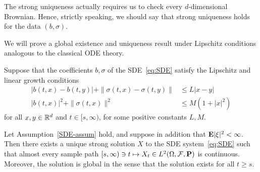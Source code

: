 \begin{remark}
	The strong uniqueness actually requires us to check every $d$-dimensional Brownian. Hence, strictly speaking, we should say that strong uniqueness holds for the data $(b,\sigma)$.
\end{remark}

We will prove a global existence and uniqueness result under Lipschitz conditions analogous to the classical ODE theory.

\begin{assumption}
	\label{SDE-assum}
	Suppose that the coefficients $b,\sigma$ of the SDE~\eqref{eq:SDE} satisfy the Lipschitz and linear growth conditions
	\begin{align}
		|b(t,x)-b(t,y)|+\|\sigma(t,x)-\sigma(t,y)\| &\le L|x-y| \label{eq:Lip}\\
		|b(t,x)|^2 + \|\sigma(t,x)\|^2 &\le M(1+|x|^2) \label{eq:growth}
	\end{align}
	for all $x,y\in\mathbb{R}^d$ and $t\in [s,\infty)$, for some positive constants $L,M$.
\end{assumption}

\begin{theorem}
\label{thm:SDE-exist-unique}
	Let Assumption~\ref{SDE-assum} hold, and suppose in addition that $\mathbf{E}|\xi|^2<\infty$. Then there exists a unique strong solution $X$ to the SDE system~\eqref{eq:SDE} such that almost every sample path $[s,\infty)\ni t\mapsto X_t\in L^2(\Omega,\mathcal{F},\mathbf{P})$ is continuous. Moreover, the solution is global in the sense that the solution exists for all $t\ge s$.
\end{theorem}

